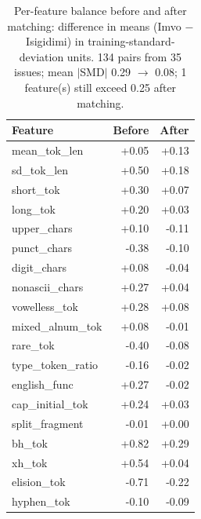 \begin{table}[h]\centering\small\caption{Per-feature balance before and after matching: difference in means (Imvo $-$ Isigidimi) in training-standard-deviation units. 134 pairs from 35 issues; mean $|$SMD$|$ 0.29 $\to$ 0.08; 1 feature(s) still exceed 0.25 after matching.}
\begin{tabular}{@{}lrr@{}}\toprule Feature & Before & After \\ \midrule
mean\_tok\_len & +0.05 & +0.13 \\
sd\_tok\_len & +0.50 & +0.18 \\
short\_tok & +0.30 & +0.07 \\
long\_tok & +0.20 & +0.03 \\
upper\_chars & +0.10 & -0.11 \\
punct\_chars & -0.38 & -0.10 \\
digit\_chars & +0.08 & -0.04 \\
nonascii\_chars & +0.27 & +0.04 \\
vowelless\_tok & +0.28 & +0.08 \\
mixed\_alnum\_tok & +0.08 & -0.01 \\
rare\_tok & -0.40 & -0.08 \\
type\_token\_ratio & -0.16 & -0.02 \\
english\_func & +0.27 & -0.02 \\
cap\_initial\_tok & +0.24 & +0.03 \\
split\_fragment & -0.01 & +0.00 \\
bh\_tok & +0.82 & +0.29 \\
xh\_tok & +0.54 & +0.04 \\
elision\_tok & -0.71 & -0.22 \\
hyphen\_tok & -0.10 & -0.09 \\
\bottomrule\end{tabular}\label{tab:balance}\end{table}
